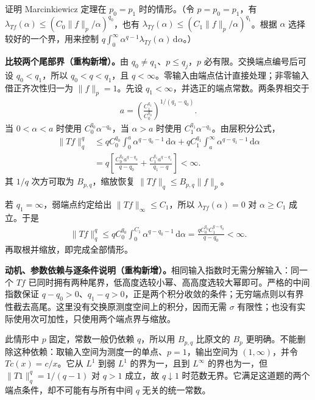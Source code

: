 \documentclass[../../main.tex]{subfiles}
\begin{document}
\begin{exercise}\label{exercise:ch06-marcinkiewicz-equal-input}
证明 Marcinkiewicz 定理在 $p_0=p_1$ 时的情形。（令 $p=p_0=p_1$，有 $\lambda_{Tf}(\alpha)\leqslant(C_0\|f\|_p/\alpha)^{q_0}$，也有 $\lambda_{Tf}(\alpha)\leqslant(C_1\|f\|_p/\alpha)^{q_1}$。根据 $\alpha$ 选择较好的一个界，用来控制 $q\int_0^\infty\alpha^{q-1}\lambda_{Tf}(\alpha)\,\mathrm d\alpha$。）
\end{exercise}
\begin{solution}
\textbf{比较两个尾部界（重构新增）。}由 $q_0\ne q_1$、$p\leqslant q_j$，$p$ 必有限。交换端点编号后可设 $q_0<q_1$，所以 $q_0<q<q_1$，且 $q<\infty$。零输入由端点估计直接处理；非零输入借正齐次性归一为 $\|f\|_p=1$。先设 $q_1<\infty$，并选正的端点常数。两条界相交于
\begin{align*}
a=\left(\frac{C_1^{q_1}}{C_0^{q_0}}\right)^{1/(q_1-q_0)}.
\end{align*}
当 $0<\alpha<a$ 时使用 $C_0^{q_0}\alpha^{-q_0}$，当 $\alpha>a$ 时使用 $C_1^{q_1}\alpha^{-q_1}$。由层积分公式，
\begin{align*}
\|Tf\|_q^q
&\leqslant qC_0^{q_0}\int_0^a\alpha^{q-q_0-1}\,\mathrm d\alpha
+qC_1^{q_1}\int_a^\infty\alpha^{q-q_1-1}\,\mathrm d\alpha\\
&=q\left[\frac{C_0^{q_0}a^{q-q_0}}{q-q_0}
+\frac{C_1^{q_1}a^{q-q_1}}{q_1-q}\right]<\infty.
\end{align*}
其 $1/q$ 次方可取为 $B_{p,q}$，缩放恢复 $\|Tf\|_q\leqslant B_{p,q}\|f\|_p$。

若 $q_1=\infty$，弱端点约定给出 $\|Tf\|_\infty\leqslant C_1$，所以 $\lambda_{Tf}(\alpha)=0$ 对 $\alpha\geqslant C_1$ 成立。于是
\begin{align*}
\|Tf\|_q^q\leqslant qC_0^{q_0}\int_0^{C_1}\alpha^{q-q_0-1}\,\mathrm d\alpha
=\frac{qC_0^{q_0}C_1^{q-q_0}}{q-q_0}<\infty.
\end{align*}
再取根并缩放，即完成全部情形。
\end{solution}
\begin{remark}
\textbf{动机、参数依赖与逐条件说明（重构新增）。}相同输入指数时无需分解输入：同一个 $Tf$ 已同时拥有两种尾界，低高度选较小幂、高高度选较大幂即可。严格的中间指数保证 $q-q_0>0$、$q_1-q>0$，正是两个积分收敛的条件；无穷端点则以有界性截去高尾。这里没有交换原测度空间上的积分，因而无需 $\sigma$ 有限性；也没有实际使用次可加性，只使用两个端点界与缩放。

此情形中 $p$ 固定，常数一般仍依赖 $q$，所以用 $B_{p,q}$ 比原文的 $B_p$ 更明确。不能删除这种依赖：取输入空间为测度一的单点、$p=1$，输出空间为 $(1,\infty)$，并令 $Tc(x)=c/x$。它从 $L^1$ 到弱 $L^1$ 的界为一，且到 $L^\infty$ 的界也为一，但 $\|T1\|_q^q=1/(q-1)$ 对 $q>1$ 成立，故 $q\downarrow1$ 时范数无界。它满足这道题的两个端点条件，却不可能有与所有中间 $q$ 无关的统一常数。
\end{remark}
\end{document}
